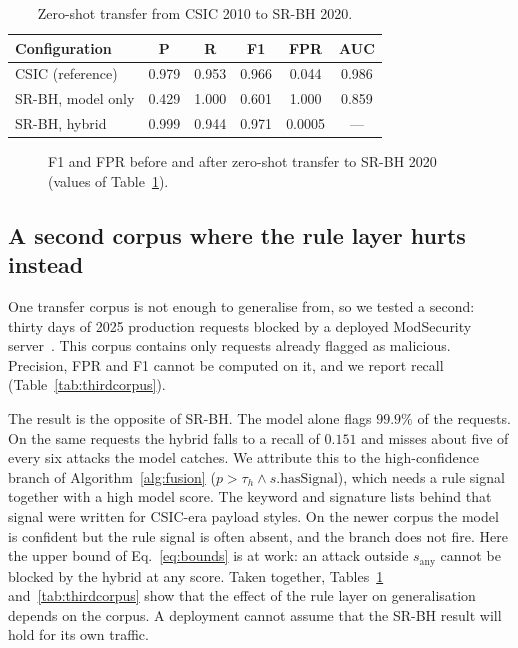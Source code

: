 \documentclass[preprint,11pt]{elsarticle}
\let\footnotesize\normalsize
\begin{document}
\begin{table}[t]
\centering
\footnotesize
\caption{Zero-shot transfer from CSIC 2010 to SR-BH 2020.}
\label{tab:cross}
\setlength{\tabcolsep}{4pt}
\begin{tabular}{@{}lccccc@{}}
\toprule
Configuration & P & R & F1 & FPR & AUC \\
\midrule
CSIC (reference) & 0.979 & 0.953 & 0.966 & 0.044 & 0.986 \\
SR-BH, model only & 0.429 & 1.000 & 0.601 & 1.000 & 0.859 \\
SR-BH, hybrid & 0.999 & 0.944 & 0.971 & 0.0005 & --- \\
\bottomrule
\end{tabular}
\end{table}

\begin{figure}[t]
\centering
{}
\caption{F1 and FPR before and after zero-shot transfer to SR-BH 2020 (values of Table~\ref{tab:cross}).}
\label{fig:cross}
\end{figure}

\subsection{A second corpus where the rule layer hurts instead}
\label{sec:secondcorpus}
One transfer corpus is not enough to generalise from, so we tested a
second: thirty days of 2025 production requests blocked by a deployed
ModSecurity server~\cite{modsec30day2025}. This corpus contains only
requests already flagged as malicious. Precision, FPR and F1 cannot be
computed on it, and we report recall (Table~\ref{tab:thirdcorpus}).

The result is the opposite of SR-BH. The model alone flags $99.9\%$ of the
requests. On the same requests the hybrid falls to a recall of $0.151$ and
misses about five of every six attacks the model catches. We attribute this
to the high-confidence branch of Algorithm~\ref{alg:fusion}
($p{>}\tau_h \wedge s.\text{hasSignal}$), which needs a rule signal
together with a high model score. The keyword and signature lists behind
that signal were written for CSIC-era payload styles. On the newer corpus
the model is confident but the rule signal is often absent, and the branch
does not fire. Here the upper bound of Eq.~\eqref{eq:bounds} is at work: an
attack outside $s_{\text{any}}$ cannot be blocked by the hybrid at any
score. Taken together, Tables~\ref{tab:cross} and~\ref{tab:thirdcorpus}
show that the effect of the rule layer on generalisation depends on the
corpus. A deployment cannot assume that the SR-BH result will hold for its
own traffic.
\end{document}
